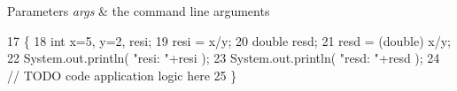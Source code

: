 \begin{DoxyParams}{Parameters}
{\em args} & the command line arguments \\
\hline
\end{DoxyParams}

\begin{DoxyCode}
17                                            \{
18         \textcolor{keywordtype}{int} x=5, y=2, resi;
19             resi = x/y;
20             \textcolor{keywordtype}{double} resd;
21             resd = (double) x/y;        
22             System.out.println( \textcolor{stringliteral}{"resi: "}+resi );
23             System.out.println( \textcolor{stringliteral}{"resd: "}+resd );
24         \textcolor{comment}{// TODO code application logic here}
25     \}
\end{DoxyCode}
